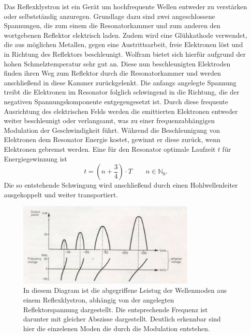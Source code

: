 Das Reflexklystron ist ein Gerät um hochfrequente Wellen entweder zu verstärken oder selbstständig anzuregen. Grundlage dazu sind zwei angeschlossene Spannungen, 
die zum einem die Resonatorkammer und zum anderen den wortgebenen Reflektor elektrisch laden. Zudem wird eine Glühkathode verwendet, die aus möglichen Metallen, 
gegen eine Austrittsarbeit, freie Elektronen löst und in Richtung des Reflektors beschleunigt. Wolfram bietet sich hierfür aufgrund der hohen Schmelztemperatur sehr gut an.
Diese nun beschleunigten Elektroden finden ihren Weg zum Reflektor durch die Resonatorkammer und werden anschließend in diese Kammer zurückgelenkt. Die anfangs angelegte Spannung treibt 
die Elektronen im Resonator folglich schwingend in die Richtung, die der negativen Spannungskomponente entgegengesetzt ist. Durch diese frequente Ausrichtung des elektrischen Felds werden die emittierten Elektronen entweder weiter beschleunigt oder 
verlangsamt, was zu einer frequenzabhängigen Modulation der Geschwindigkeit führt. Während die Beschleunigung von Elektronen dem Resonator Energie kostet, gewinnt er diese zurück, wenn Elektronen gebremst werden. 
Eine für den Resonator optimale Laufzeit $t$ für Energiegewinnung ist 
\begin{equation*}
    t = \left(n+ \frac{3}{4} \right) \cdot T  \quad \quad n \in \mathbb{N}_0.
\end{equation*}
Die so entstehende Schwingung wird anschließend durch einen Hohlwellenleiter ausgekoppelt und weiter transportiert.
\begin{figure}
    \centering
    \includegraphics[width=0.8\textwidth]{bilder/dia.jpg}
    \caption{In diesem Diagram ist die abgegriffene Leistug der Wellenmoden aus einem Reflexklystron, abhängig von der angelegten Reflektorspannung dargestellt.
    Die entsprechende Frequenz ist darunter mit gleicher Abszisse dargestellt. Deutlich erkennbar sind hier die einzelenen Moden die durch die Modulation entstehen.} 
    \label{fig:ref}
\end{figure}
